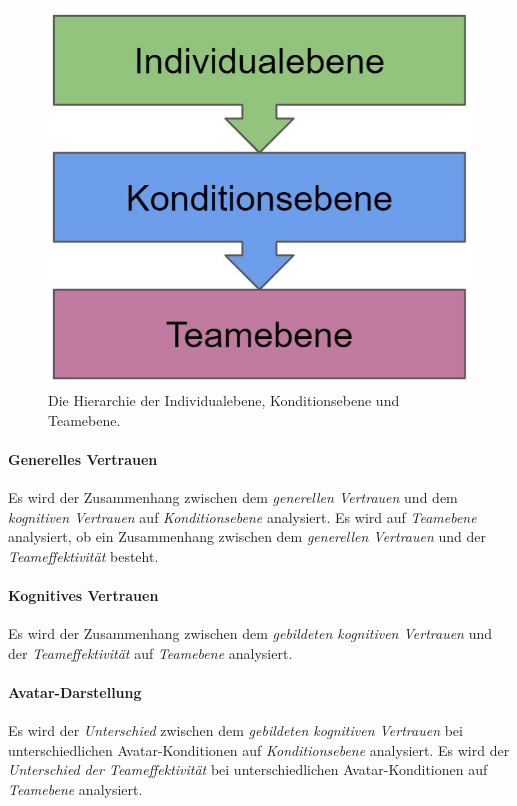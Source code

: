 \documentclass[a4paper,11pt]{article}%
\renewcommand{\\}{\vspace*{0.5\baselineskip} \newline}
\begin{document}
\begin{figure}[H]
		\begin{footnotesize}
		\centering
			\includegraphics[scale=0.4]{Abbildungen/DifferentLevels.JPG}	
			\caption[Die Hierarchieebenen]{Die Hierarchie der Individualebene, Konditionsebene und Teamebene.}
			\label{DifferentLevels}
		\end{footnotesize}
	\end{figure}

\paragraph{Generelles Vertrauen}
Es wird der Zusammenhang zwischen dem \textit{generellen Vertrauen} und dem \textit{kognitiven Vertrauen} auf \textit{Konditionsebene} analysiert.
Es wird auf \textit{Teamebene} analysiert, ob ein Zusammenhang zwischen dem \textit{generellen Vertrauen} und der \textit{Teameffektivität} besteht.

\paragraph{Kognitives Vertrauen}
Es wird der Zusammenhang zwischen dem \textit{gebildeten kognitiven Vertrauen} und der \textit{Teameffektivität} auf \textit{Teamebene} analysiert.

\paragraph{Avatar-Darstellung}
Es wird der \textit{Unterschied} zwischen dem \textit{gebildeten kognitiven Vertrauen} bei unterschiedlichen Avatar-Konditionen auf \textit{Konditionsebene} analysiert.
Es wird der \textit{Unterschied} \textit{der Teameffektivität} bei unterschiedlichen Avatar-Konditionen auf \textit{Teamebene} analysiert.
\end{document}
